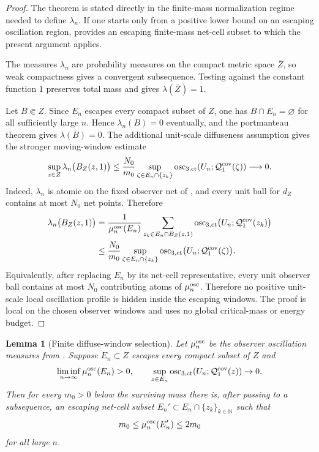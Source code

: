 \documentclass[11pt]{amsart}
\numberwithin{equation}{section}
\theoremstyle{plain}
\newtheorem{lemma}[lemma]{Lemma}
\theoremstyle{definition}
\theoremstyle{remark}
\newcommand{\actthree}{\operatorname{osc}_{3,\mathrm{ct}}}
\begin{document}
\begin{proof}
The theorem is stated directly in the finite-mass normalization regime needed
to define \(\lambda_n\).  If one starts only from a positive lower bound on an
escaping oscillation region, 
provides an escaping finite-mass net-cell subset to which the present argument
applies.

The measures \(\lambda_n\) are probability measures on the compact metric space
\(\overline Z\), so weak compactness gives a convergent subsequence.  Testing
against the constant function \(1\) preserves total mass and gives
\(\lambda(\overline Z)=1\).

Let \(B\Subset Z\).  Since \(E_n\) escapes every compact subset of \(Z\), one
has \(B\cap E_n=\varnothing\) for all sufficiently large \(n\).  Hence
\(\lambda_n(B)=0\) eventually, and the portmanteau theorem gives
\(\lambda(B)=0\).  The additional unit-scale diffuseness assumption gives the
stronger moving-window estimate
\[
   \sup_{z\in Z}
      \lambda_n\bigl(B_Z(z,1)\bigr)
   \le
   \frac{N_0}{m_0}
   \sup_{\zeta\in E_n\cap\{z_k\}}
      \actthree(U_n;\mathcal Q_1^{\rm cov}(\zeta))
   \longrightarrow0 .
\]
Indeed, \(\lambda_n\) is atomic on the fixed observer net of
, and every unit ball for \(d_Z\) contains at
most \(N_0\) net points.  Therefore
\[
\begin{aligned}
   \lambda_n\bigl(B_Z(z,1)\bigr)
   &=
   \frac{1}{\mu_n^{\rm osc}(E_n)}
   \sum_{z_k\in E_n\cap B_Z(z,1)}
      \actthree\bigl(U_n;\mathcal Q_1^{\rm cov}(z_k)\bigr)
   \\
   &\le
   \frac{N_0}{m_0}
   \sup_{\zeta\in E_n\cap\{z_k\}}
      \actthree\bigl(U_n;\mathcal Q_1^{\rm cov}(\zeta)\bigr).
\end{aligned}
\]
Equivalently, after replacing \(E_n\) by its net-cell representative, every
unit observer ball contains at most \(N_0\) contributing atoms of
\(\mu_n^{\rm osc}\).
Therefore no positive unit-scale local oscillation profile is hidden inside the
escaping windows.  The proof is local on the chosen observer windows and uses no
global critical-mass or energy budget.
\end{proof}

\begin{lemma}[Finite diffuse-window selection]
\label{lem:finite-diffuse-window-selection}
Let \(\mu_n^{\rm osc}\) be the observer oscillation measures from
.  Suppose \(E_n\subset Z\) escapes every compact
subset of \(Z\) and
\[
   \liminf_{n\to\infty}\mu_n^{\rm osc}(E_n)>0,
   \qquad
   \sup_{z\in E_n}\actthree(U_n;\mathcal Q_1^{\rm cov}(z))\to0 .
\]
Then for every \(m_0>0\) below the surviving mass there is, after passing to a
subsequence, an escaping net-cell subset \(E_n'\subset E_n\cap\{z_k\}_{k\in\mathbb N}\)
such that
\[
   m_0\le \mu_n^{\rm osc}(E_n')\le 2m_0
\]
for all large \(n\).
\end{lemma}
\end{document}
